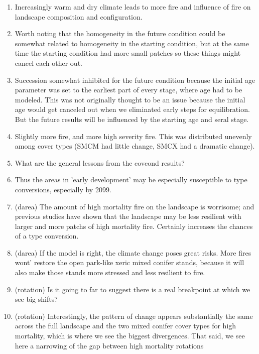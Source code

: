 \documentclass[12pt]{article}
\begin{document}
\begin{spacing}{1}
\begin{enumerate}
	\item Increasingly warm and dry climate leads to more fire and influence of fire on landscape composition and configuration.
	\item Worth noting that the homogeneity in the future condition could be somewhat related to homogeneity in the starting condition, but at the same time the starting condition had more small patches so these things might cancel each other out.
	\item Succession somewhat inhibited for the future condition because the initial age parameter was set to the earliest part of every stage, where age had to be modeled. This was not originally thought to be an issue because the initial age would get canceled out when we eliminated early steps for equilibration. But the future results will be influenced by the starting age and seral stage.
	\item Slightly more fire, and more high severity fire. This was distributed unevenly among cover types (SMCM had little change, SMCX had a dramatic change).
	\item What are the general lessons from the covcond results?
	\item Thus the areas in 'early development' may be especially susceptible to type conversions, especially by 2099.
	\item (darea) The amount of high mortality fire on the landscape is worrisome; and previous studies have shown that the landscape may be less resilient with larger and more patchs of high mortality fire. Certainly increases the chances of a type conversion. 
	\item (darea) If the model is right, the climate change poses great risks. More fires wont' restore the open park-like xeric mixed conifer stands, because it will also make those stands more stressed and less resilient to fire.
	\item (rotation) Is it going to far to suggest there is a real breakpoint at which we see big shifts?
	\item (rotation) Interestingly, the pattern of change appears substantially the same across the full landscape and the two mixed conifer cover types for high mortality, which is where we see the biggest divergences. That said, we see here a narrowing of the gap between high mortality rotations 

\end{enumerate}


\end{spacing}
\end{document}
